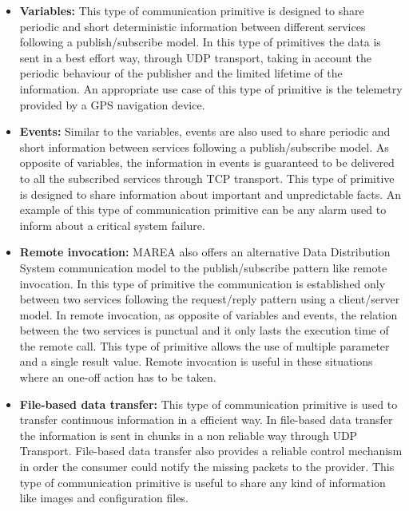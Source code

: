 \begin{itemize}
\item \textbf{Variables:} This type of communication primitive is designed to share periodic and short deterministic information between different services following a publish/subscribe model. In this type of primitives the data is sent in a best effort way, through UDP transport, taking in account the periodic behaviour of the publisher and the limited lifetime of the information. An appropriate use case of this type of primitive is the telemetry provided by a GPS navigation device.   

\item \textbf{Events:} Similar to the variables, events are also used to share periodic and short information between services following a publish/subscribe model. As opposite of variables, the information in events is guaranteed to be delivered to all the subscribed services through TCP transport. This type of primitive is designed to share information about important and unpredictable facts. An example of this type of communication primitive can be any alarm used to inform about a critical system failure. 

\item \textbf{Remote invocation:} MAREA also offers an alternative Data Distribution System communication model to the publish/subscribe pattern like remote invocation. In this type of primitive the communication is established only between two services following the request/reply pattern using a client/server model. In remote invocation, as opposite of variables and events, the relation between the two services is punctual and it only lasts the execution time of the remote call. This type of primitive allows the use of multiple parameter and a single result value. Remote invocation is useful in these situations where an one-off action has to be taken.

\item \textbf{File-based data transfer:} This type of communication primitive is used to transfer continuous 
information in a efficient way. In file-based data transfer the information is sent in chunks in a non reliable way through UDP Transport. File-based data transfer also provides a reliable control mechanism in order the consumer could notify the missing packets to the provider. This type of communication primitive is useful to share any kind of information like images and configuration files.
\end{itemize}

